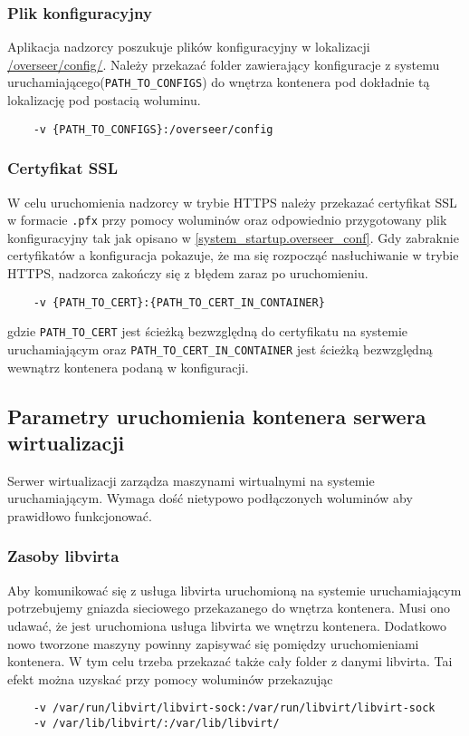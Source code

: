 \documentclass[../opis-rozwiazania.tex]{subfiles}
\begin{document}
\subsubsection{Plik konfiguracyjny}
Aplikacja nadzorcy poszukuje plików konfiguracyjny w lokalizacji \url{/overseer/config/}.
Należy przekazać folder zawierający konfiguracje z systemu uruchamiającego(\texttt{PATH\_TO\_CONFIGS}) do wnętrza kontenera pod dokładnie tą lokalizację pod postacią woluminu.
\begin{verbatim}
	-v {PATH_TO_CONFIGS}:/overseer/config
\end{verbatim}

\subsubsection{Certyfikat SSL}
W celu uruchomienia nadzorcy w trybie HTTPS należy przekazać certyfikat SSL w formacie \texttt{.pfx} przy pomocy woluminów oraz odpowiednio przygotowany plik konfiguracyjny tak jak opisano w \ref{system_startup.overseer_conf}.
Gdy zabraknie certyfikatów a konfiguracja pokazuje, że ma się rozpocząć nasłuchiwanie w trybie HTTPS, nadzorca zakończy się z błędem zaraz po uruchomieniu.

\begin{verbatim}
	-v {PATH_TO_CERT}:{PATH_TO_CERT_IN_CONTAINER}
\end{verbatim}
gdzie \texttt{PATH\_TO\_CERT} jest ścieżką bezwzględną do certyfikatu na systemie uruchamiającym oraz \texttt{PATH\_TO\_CERT\_IN\_CONTAINER} jest ścieżką bezwzględną wewnątrz kontenera podaną w konfiguracji.

\subsection{Parametry uruchomienia kontenera serwera wirtualizacji}
Serwer wirtualizacji zarządza maszynami wirtualnymi na systemie uruchamiającym.
Wymaga dość nietypowo podłączonych woluminów aby prawidłowo funkcjonować.

\subsubsection{Zasoby libvirta}
Aby komunikować się z usługa libvirta uruchomioną na systemie uruchamiającym potrzebujemy gniazda sieciowego przekazanego do wnętrza kontenera.
Musi ono udawać, że jest uruchomiona usługa libvirta we wnętrzu kontenera.
Dodatkowo nowo tworzone maszyny powinny zapisywać się pomiędzy uruchomieniami kontenera.
W tym celu trzeba przekazać także cały folder z danymi libvirta.
Tai efekt można uzyskać przy pomocy woluminów przekazując
\begin{verbatim}
	-v /var/run/libvirt/libvirt-sock:/var/run/libvirt/libvirt-sock
	-v /var/lib/libvirt/:/var/lib/libvirt/
\end{verbatim}
\end{document}
